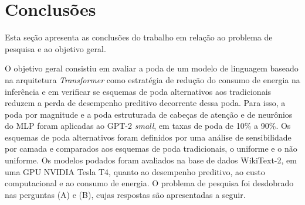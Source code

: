\section{Conclusões}\label{sec:conclusoes}

Esta seção apresenta as conclusões do trabalho em relação ao problema de pesquisa e ao
objetivo geral.

O objetivo geral consistiu em avaliar a poda de um modelo de linguagem baseado na arquitetura
\textit{Transformer} como estratégia de redução do consumo de energia na inferência e em
verificar se esquemas de poda alternativos aos tradicionais reduzem a perda de desempenho
preditivo decorrente dessa poda. Para isso, a poda por magnitude e a poda estruturada de
cabeças de atenção e de neurônios do MLP foram aplicadas ao GPT-2 \textit{small}, em taxas de
poda de 10\% a 90\%. Os esquemas de poda alternativos foram definidos por uma análise de
sensibilidade por camada e comparados aos esquemas de poda tradicionais, o uniforme e o não
uniforme. Os modelos
podados foram avaliados na base de dados WikiText-2, em uma GPU NVIDIA Tesla T4, quanto ao
desempenho preditivo, ao custo computacional e ao consumo de energia. O problema de pesquisa
foi desdobrado nas perguntas (A) e (B), cujas respostas são apresentadas a seguir.

